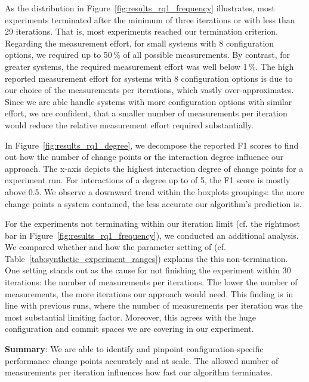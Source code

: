 \documentclass[sigconf]{acmart}
\newcommand{\greybox}[1]{
	\begin{mdframed}[backgroundcolor=black!10!white,linewidth=0pt,backgroundcolor=black!10,linewidth=0pt,innerleftmargin=5pt,innertopmargin=5pt]
		#1
	\end{mdframed}
}
\begin{document}
	As the distribution in Figure~\ref{fig:results_rq1_frequency} illustrates, most experiments terminated after the minimum of three iterations or with less than 29 iterations. That is, most experiments reached our termination criterion. 
	Regarding the measurement effort, for small systems with 8 configuration options, we required up to 50\,\% of all possible measurements. By contrast, for greater systems, the required measurement effort was well below 1\,\%. The high reported measurement effort for systems with 8 configuration options is due to our choice of the measurements per iterations, which vastly over-approximates. Since we are able handle systems with more configuration options with similar effort, we are confident, that a smaller number of measurements per iteration would reduce the relative measurement effort required substantially.
	
	In Figure~\ref{fig:results_rq1_degree}, we decompose the reported F1 scores to find out how the number of change points or the interaction degree influence our approach. The x-axis depicts the highest interaction degree of change points for a experiment run. For interactions of a degree up to of 5, the F1 score is mostly above 0.5. We observe a downward trend within the boxplots groupings: the more change points a system contained, the less accurate our algorithm's prediction is.

	For the experiments not terminating within our iteration limit (cf. the rightmost bar in Figure~\ref{fig:results_rq1_frequency}), we conducted an additional analysis. We compared whether and how the parameter setting of (cf. Table~\ref{tab:synthetic_experiment_ranges}) explains the this non-termination. One setting stands out as the cause for not finishing the experiment within 30 iterations: the number of measurements per iterations. The lower the number of measurements, the more iterations our approach would need. This finding is in line with previous runs, where the number of measurements per iteration was the most substantial limiting factor. Moreover, this agrees with the huge configuration and commit spaces we are covering in our experiment. 
	\vspace{2mm}
	\greybox{
		\textbf{Summary}: We are able to identify and pinpoint configuration-specific performance change points accurately and at scale. The allowed number of measurements per iteration influences how fast our algorithm terminates.
    }
	
\end{document}

